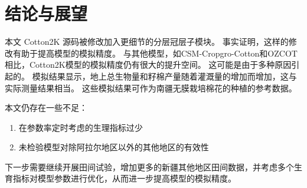 \chapter{结论与展望}

本文 Cotton2K 源码被修改加入更细节的分层冠层子模块。%
事实证明，这样的修改有助于提高模型的模拟精度。
与其他模型，如CSM-Cropgro-Cotton和OZCOT相比，Cotton2K模型的模拟精度仍有很大的提升空间。%
这可能是由于多种原因引起的。%
模拟结果显示，地上总生物量和籽棉产量随着灌溉量的增加而增加，这与实际测量结果相当。%
这些模拟结果可作为南疆无膜栽培棉花的种植的参考数据。

本文仍存在一些不足：
\begin{enumerate}
    \item 在参数率定时考虑的生理指标过少
    \item 未检验模型对除阿拉尔地区以外的其他地区的有效性
\end{enumerate}

下一步需要继续开展田间试验，增加更多的新疆其他地区田间数据，并考虑多个生育指标对模型参数进行优化，从而进一步提高模型的模拟精度。